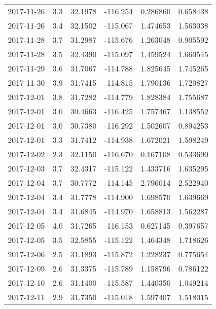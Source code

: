 \begin{tabular}{lrrrrr}
2017-11-26 &       3.3 &  32.1978 &  -116.254 &         0.286860 &         0.658438 \\
2017-11-26 &       3.4 &  32.1502 &  -115.067 &         1.474653 &         1.563038 \\
2017-11-28 &       3.7 &  31.2987 &  -115.676 &         1.263048 &         0.905592 \\
2017-11-28 &       3.5 &  32.4390 &  -115.097 &         1.459524 &         1.660545 \\
2017-11-29 &       3.6 &  31.7067 &  -114.788 &         1.825645 &         1.745265 \\
2017-11-30 &       3.9 &  31.7415 &  -114.815 &         1.790136 &         1.720827 \\
2017-12-01 &       3.8 &  31.7282 &  -114.779 &         1.828384 &         1.755687 \\
2017-12-01 &       3.0 &  30.4663 &  -116.425 &         1.757467 &         1.138552 \\
2017-12-01 &       3.0 &  30.7380 &  -116.292 &         1.502607 &         0.894253 \\
2017-12-01 &       3.3 &  31.7412 &  -114.938 &         1.672021 &         1.598249 \\
2017-12-02 &       2.3 &  32.1150 &  -116.670 &         0.167108 &         0.533690 \\
2017-12-03 &       3.7 &  32.4317 &  -115.122 &         1.433716 &         1.635295 \\
2017-12-04 &       3.7 &  30.7772 &  -114.145 &         2.796014 &         2.522940 \\
2017-12-04 &       3.4 &  31.7778 &  -114.900 &         1.698570 &         1.639669 \\
2017-12-04 &       3.4 &  31.6845 &  -114.970 &         1.658813 &         1.562287 \\
2017-12-05 &       4.0 &  31.7265 &  -116.153 &         0.627145 &         0.397657 \\
2017-12-05 &       3.5 &  32.5855 &  -115.122 &         1.464348 &         1.718626 \\
2017-12-06 &       2.5 &  31.1893 &  -115.872 &         1.228237 &         0.775654 \\
2017-12-09 &       2.6 &  31.3375 &  -115.789 &         1.158796 &         0.786122 \\
2017-12-10 &       2.6 &  31.1400 &  -115.587 &         1.440350 &         1.049214 \\
2017-12-11 &       2.9 &  31.7350 &  -115.018 &         1.597407 &         1.518015 \\

\end{tabular}
